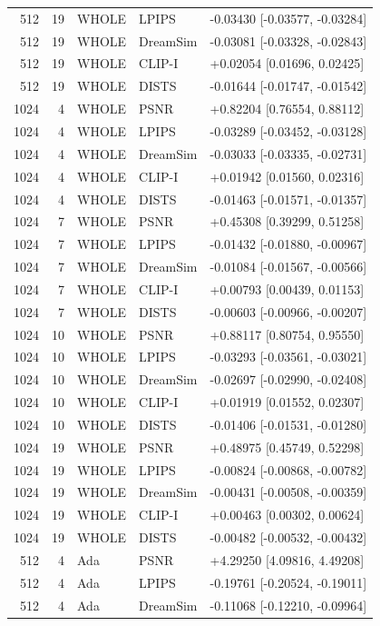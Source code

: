 \documentclass[10pt,letterpaper]{article}
\begin{document}
\begin{longtable}{@{}rrlll@{}}
512 & 19 & WHOLE & LPIPS & -0.03430 [-0.03577, -0.03284]\\
512 & 19 & WHOLE & DreamSim & -0.03081 [-0.03328, -0.02843]\\
512 & 19 & WHOLE & CLIP-I & +0.02054 [0.01696, 0.02425]\\
512 & 19 & WHOLE & DISTS & -0.01644 [-0.01747, -0.01542]\\
1024 & 4 & WHOLE & PSNR & +0.82204 [0.76554, 0.88112]\\
1024 & 4 & WHOLE & LPIPS & -0.03289 [-0.03452, -0.03128]\\
1024 & 4 & WHOLE & DreamSim & -0.03033 [-0.03335, -0.02731]\\
1024 & 4 & WHOLE & CLIP-I & +0.01942 [0.01560, 0.02316]\\
1024 & 4 & WHOLE & DISTS & -0.01463 [-0.01571, -0.01357]\\
1024 & 7 & WHOLE & PSNR & +0.45308 [0.39299, 0.51258]\\
1024 & 7 & WHOLE & LPIPS & -0.01432 [-0.01880, -0.00967]\\
1024 & 7 & WHOLE & DreamSim & -0.01084 [-0.01567, -0.00566]\\
1024 & 7 & WHOLE & CLIP-I & +0.00793 [0.00439, 0.01153]\\
1024 & 7 & WHOLE & DISTS & -0.00603 [-0.00966, -0.00207]\\
1024 & 10 & WHOLE & PSNR & +0.88117 [0.80754, 0.95550]\\
1024 & 10 & WHOLE & LPIPS & -0.03293 [-0.03561, -0.03021]\\
1024 & 10 & WHOLE & DreamSim & -0.02697 [-0.02990, -0.02408]\\
1024 & 10 & WHOLE & CLIP-I & +0.01919 [0.01552, 0.02307]\\
1024 & 10 & WHOLE & DISTS & -0.01406 [-0.01531, -0.01280]\\
1024 & 19 & WHOLE & PSNR & +0.48975 [0.45749, 0.52298]\\
1024 & 19 & WHOLE & LPIPS & -0.00824 [-0.00868, -0.00782]\\
1024 & 19 & WHOLE & DreamSim & -0.00431 [-0.00508, -0.00359]\\
1024 & 19 & WHOLE & CLIP-I & +0.00463 [0.00302, 0.00624]\\
1024 & 19 & WHOLE & DISTS & -0.00482 [-0.00532, -0.00432]\\
512 & 4 & Ada & PSNR & +4.29250 [4.09816, 4.49208]\\
512 & 4 & Ada & LPIPS & -0.19761 [-0.20524, -0.19011]\\
512 & 4 & Ada & DreamSim & -0.11068 [-0.12210, -0.09964]\\

\end{longtable}
\end{document}
